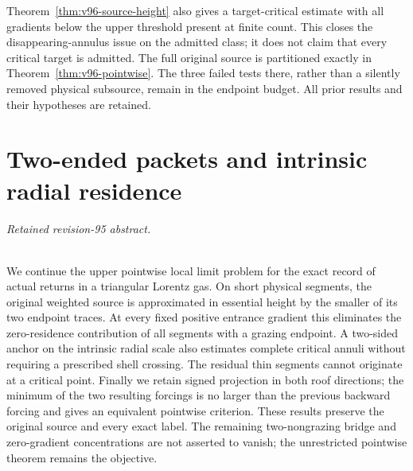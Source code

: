 \documentclass[11pt,reqno]{amsart}
\numberwithin{equation}{section}
\theoremstyle{definition}\newtheorem{definition}[theorem]{Definition}
\theoremstyle{remark}\newtheorem{remark}[theorem]{Remark}
\theoremstyle{definition}\newtheorem{inputstatement}[theorem]{Input statement}
\begin{document}
Theorem~\ref{thm:v96-source-height} also gives a target-critical estimate
with all gradients below the upper threshold present at finite count.
This closes the disappearing-annulus issue on the admitted class;
it does not claim that every critical target is admitted. The full
original source is partitioned exactly in
Theorem~\ref{thm:v96-pointwise}. The three failed tests there, rather
than a silently removed physical subsource, remain in the endpoint
budget. All prior results and their hypotheses are retained.






\appendix


\endgroup
\part{Two-ended packets and intrinsic radial residence}
\begingroup
\let\ArchiveLabel\label
\let\ArchiveRef\ref
\renewcommand{\label}[1]{\ArchiveLabel{v95archive:#1}}
\renewcommand{\ref}[1]{%
  \IfBeginWith{#1}{supp-}{%
    \StrBehind{#1}{supp-}[\ArchiveTarget]%
    \ArchiveRef{\ArchiveTarget}%
  }{\ArchiveRef{v95archive:#1}}%
}
\makeatletter
\let\ltx@label\label
\makeatother
\paragraph{Retained revision-95 abstract.}

We continue the upper pointwise local limit problem for the exact record
of actual returns in a triangular Lorentz gas. On short physical segments,
the original weighted source is approximated in essential height by the
smaller of its two endpoint traces. At every fixed positive entrance
gradient this eliminates the zero-residence contribution of all segments
with a grazing endpoint. A two-sided anchor on the intrinsic radial scale
also estimates complete critical annuli without requiring a prescribed
shell crossing. The residual thin segments cannot originate at a critical
point. Finally we retain signed projection in both roof directions; the
minimum of the two resulting forcings is no larger than the previous
backward forcing and gives an equivalent pointwise criterion. These
results preserve the original source and every exact label. The remaining
two-nongrazing bridge and zero-gradient concentrations are not asserted
to vanish; the unrestricted pointwise theorem remains the objective.
\end{document}
